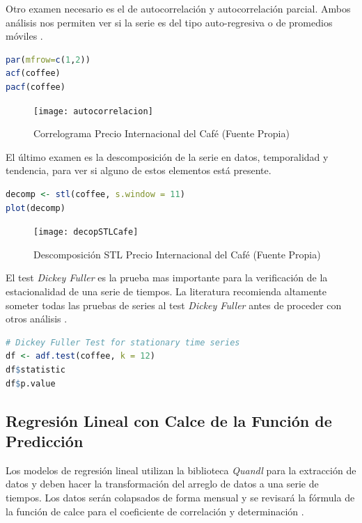 Otro examen necesario es el de autocorrelación y autocorrelación parcial. Ambos análisis nos permiten ver si la serie es del tipo auto-regresiva o de promedios móviles \cite{hyndman}.

\begin{lstlisting}[language=R]
par(mfrow=c(1,2))
acf(coffee)
pacf(coffee)
\end{lstlisting}

\begin{figure}[H]
	\centering
	\texttt{[image: autocorrelacion]}\\
	\caption{Correlograma Precio Internacional del Café (Fuente Propia)}
\end{figure}

El último examen es la descomposición de la serie en datos, temporalidad y tendencia, para ver si alguno de estos elementos está presente.

\begin{lstlisting}[language=R]
decomp <- stl(coffee, s.window = 11)
plot(decomp)
\end{lstlisting}

\begin{figure}[H]
	\centering
	\texttt{[image: decopSTLCafe]}\\
	\caption{Descomposición STL Precio Internacional del Café (Fuente Propia)}
\end{figure}

El test \emph{Dickey Fuller} \cite{dickeyfuller} es la prueba mas importante para la verificación de la estacionalidad de una serie de tiempos. La literatura recomienda altamente someter todas las pruebas de series al test \emph{Dickey Fuller} antes de proceder con otros análisis \cite{hyndman}.

\begin{lstlisting}[language=R]
# Dickey Fuller Test for stationary time series
df <- adf.test(coffee, k = 12)
df$statistic
df$p.value
\end{lstlisting}

\subsection{Regresión Lineal con Calce de la Función de Predicción}
Los modelos de regresión lineal utilizan la biblioteca \emph{Quandl} para la extracción de datos y deben hacer la transformación del arreglo de datos a una serie de tiempos. Los datos serán colapsados de forma mensual y se revisará la fórmula de la función de calce para el coeficiente de correlación y determinación \cite{narayanachar}.

